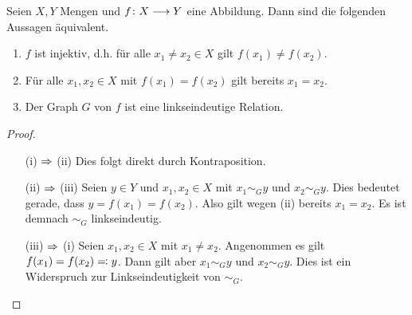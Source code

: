 \begin{bem}
\label{bem:inj}

  Seien $X, Y$ Mengen und $f\colon X \longrightarrow Y$ eine Abbildung. Dann sind
  die folgenden Aussagen äquivalent.
  \begin{enumerate}

    \item $f$ ist injektiv, d.h. für alle $x_{1}\neq x_{2} \in X$ gilt
      $f(x_{1})\neq f(x_{2})$.

    \item Für alle $x_{1},x_{2}\in X$ mit $f(x_{1})=f(x_{2})$ gilt
      bereits $x_{1}=x_{2}$.


    \item Der Graph $G$ von $f$ ist eine linkseindeutige Relation.

  \end{enumerate}

  \begin{proof}
    \quad

    \begin{itemize}
    \item[\tiny{(i) $\Rightarrow$ (ii)}] 
      Dies folgt direkt durch Kontraposition.


    \item[\tiny{(ii) $\Rightarrow$ (iii)}] Seien $y\in Y$ und $x_{1},x_{2}\in X$ mit
      $x_{1}\sim_{G}y$ und $x_{2}\sim_{G}y$. Dies bedeutet gerade, dass $y =
      f(x_{1}) = f(x_{2})$. Also gilt wegen (ii) bereits $x_{1} = x_{2}$. Es ist
      demnach $\sim_{G}$ linkseindeutig.

    \item[\tiny{(iii) $\Rightarrow$ (i)}] Seien $x_{1}, x_{2} \in X$ mit $x_{1}\neq
      x_{2}$. Angenommen es gilt $f(x_{1}) = f(x_{2}) \eqqcolon y$. Dann gilt aber
      $x_{1}\sim_{G}y$ und $x_{2}\sim_{G} y$. Dies ist ein Widerspruch zur
      Linkseindeutigkeit von $\sim_{G}$.

    \end{itemize}

  \end{proof}

\end{bem}

